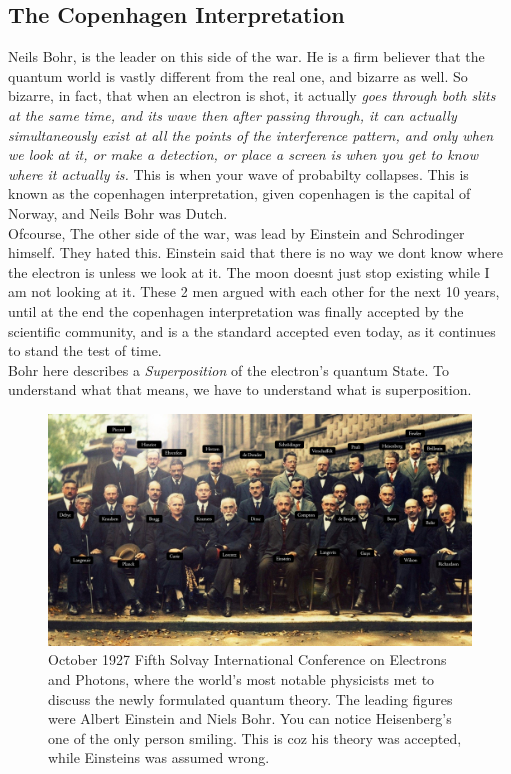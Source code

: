 \documentclass[11pt]{article}
\begin{document}
\subsection{The Copenhagen Interpretation}
Neils Bohr, is the leader on this side of the war. He is a firm believer that the quantum world is vastly different from the real one, and bizarre as well. So bizarre, in fact, that when an electron is shot, it actually \textit{goes through both slits at the same time, and its wave then after passing through, it can actually simultaneously exist at all the points of the interference pattern, and only when we look at it, or make a detection, or place a screen is when you get to know where it actually is.} This is when your wave of probabilty collapses. This is known as the copenhagen interpretation, given copenhagen is the capital of Norway, and Neils Bohr was Dutch.  \\

Ofcourse, The other side of the war, was lead by Einstein and Schrodinger himself. They hated this. Einstein said that there is no way we dont know where the electron is unless we look at it. The moon doesnt just stop existing while I am not looking at it. These 2 men argued with each other for the next 10 years, until at the end the copenhagen interpretation was finally accepted by the scientific community, and is a the standard accepted even today, as it continues to stand the test of time. \\

Bohr here describes a \textit{Superposition} of the electron's quantum State. To understand what that means, we have to understand what is superposition.


\begin{figure}
	\begin{center}
		\includegraphics[scale=0.25]{1935 Quantum Mechanics Conference.png}
		\caption{October 1927 Fifth Solvay International Conference on Electrons and Photons, where the world’s most notable physicists met to discuss the newly formulated quantum theory. The leading figures were Albert Einstein and Niels Bohr. You can notice Heisenberg's one of the only person smiling. This is coz his theory was accepted, while Einsteins was assumed wrong. }
	\end{center}
\end{figure}
\end{document}
